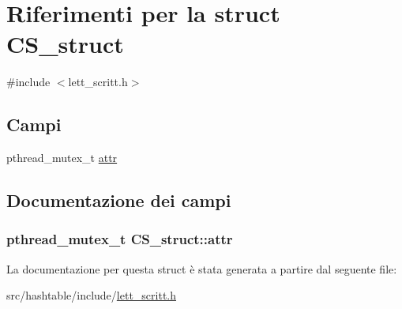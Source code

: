 \hypertarget{structCS__struct}{
\section{Riferimenti per la struct CS\_\-struct}
\label{structCS__struct}
}


{\ttfamily \#include $<$lett\_\-scritt.h$>$}

\subsection*{Campi}
\begin{DoxyCompactItemize}
\item 
pthread\_\-mutex\_\-t \hyperlink{structCS__struct_af065e125e4ff3613892e0d2fbfe8f7dc}{attr}
\end{DoxyCompactItemize}


\subsection{Documentazione dei campi}
\hypertarget{structCS__struct_af065e125e4ff3613892e0d2fbfe8f7dc}{
\subsubsection[{attr}]{\setlength{\rightskip}{0pt plus 5cm}pthread\_\-mutex\_\-t {\bf CS\_\-struct::attr}}}
\label{structCS__struct_af065e125e4ff3613892e0d2fbfe8f7dc}


La documentazione per questa struct è stata generata a partire dal seguente file:\begin{DoxyCompactItemize}
\item 
src/hashtable/include/\hyperlink{lett__scritt_8h}{lett\_\-scritt.h}\end{DoxyCompactItemize}
